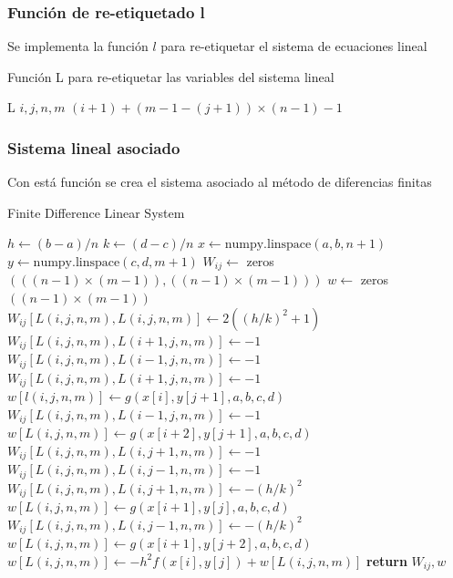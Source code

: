 \documentclass[a4paper]{article}
\begin{document}
\subsubsection{Función de re-etiquetado l}
Se implementa la función $l$ para re-etiquetar el sistema de ecuaciones lineal
\begin{algorithm}[H]
\caption{Función L para re-etiquetar las variables del sistema lineal}\label{alg::funcL}
\begin{algorithmic}[H]
\Function L {$i, j, n, m$}
\State \Return $(i+1) + (m-1-(j+1)) \times (n-1) - 1$
\EndFunction
\end{algorithmic}
\end{algorithm}
\subsubsection{Sistema lineal asociado}
Con está función se crea el sistema asociado al método de diferencias finitas
\begin{algorithm}[H]
\caption{Finite Difference Linear System}\label{alg::finite_difference}
\begin{algorithmic}[H]
\State $h \gets (b-a)/n$
\State $k \gets (d-c)/n$
\State $x \gets \text{numpy.linspace}(a, b, n+1)$
\State $y \gets \text{numpy.linspace}(c, d, m+1)$
\State $W_{ij} \gets$ zeros $(((n-1)\times(m-1)),((n-1)\times(m-1)))$
\State $w \gets$ zeros $((n-1)\times(m-1))$
\State $W_{ij}[L(i,j,n,m), L(i,j,n,m)] \gets 2((h/k)^2 + 1)$
\State $W_{ij}[L(i,j,n,m), L(i+1,j,n,m)] \gets -1$
\State $W_{ij}[L(i,j,n,m), L(i-1,j,n,m)] \gets -1$
\Else
{}
\State $W_{ij}[L(i,j,n,m), L(i+1,j,n,m)] \gets -1$
\State $w[l(i,j,n,m)] \gets g(x[i], y[j+1], a, b, c, d)$
\EndIf
{}
\State $W_{ij}[L(i,j,n,m), L(i-1,j,n,m)] \gets -1$
\State $w[L(i,j,n,m)] \gets g(x[i+2], y[j+1], a, b, c, d)$
\EndIf
\EndIf
{}
\State $W_{ij}[L(i,j,n,m), L(i,j+1,n,m)] \gets -1$
\State $W_{ij}[L(i,j,n,m), L(i,j-1,n,m)] \gets -1$
\Else
{}
\State $W_{ij}[L(i,j,n,m), L(i,j+1,n,m)] \gets -(h/k)^2$
\State $w[L(i,j,n,m)] \gets g(x[i+1], y[j], a, b, c, d)$
\EndIf
{}
\State $W_{ij}[L(i,j,n,m), L(i,j-1,n,m)] \gets -(h/k)^2$
\State $w[L(i,j,n,m)] \gets g(x[i+1], y[j+2], a, b, c, d)$
\EndIf
\EndIf
\State $w[L(i,j,n,m)] \gets -h^2f(x[i], y[j])+w[L(i,j,n,m)]$
\EndFor
\EndFor
\State \textbf{return} $W_{ij}, w$
\EndFunction
\end{algorithmic}
\end{algorithm}
\end{document}
